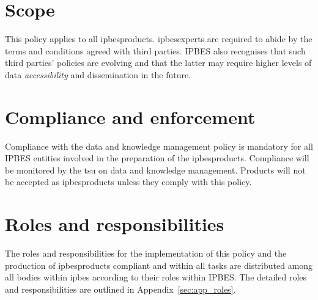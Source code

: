 \documentclass{article}
\begin{document}
\section{Scope}

This policy applies to all \glspl{ipbesproduct}. \glspl{ipbesexpert} are required to abide by the terms and conditions agreed with third parties. IPBES also recognises that such third parties’ policies are evolving and that the latter may require higher levels of \gls{data} \textit{accessibility} and dissemination in the future.

\section{Compliance and enforcement}

Compliance with the data and knowledge management policy is mandatory for all IPBES entities involved in the preparation of the \glspl{ipbesproduct}. Compliance will be monitored by the \gls{tsu} on data and knowledge management. Products will not be accepted as \glspl{ipbesproduct} unless they comply with this policy.

\section{Roles and responsibilities}

The roles and responsibilities for the implementation of this policy and the production of \glspl{ipbesproduct} compliant and within all \glspl{task} are distributed among all bodies within \gls{ipbes} according to their roles within IPBES. The detailed roles and responsibilities are outlined in Appendix~\ref{sec:app_roles}.


\end{document}
